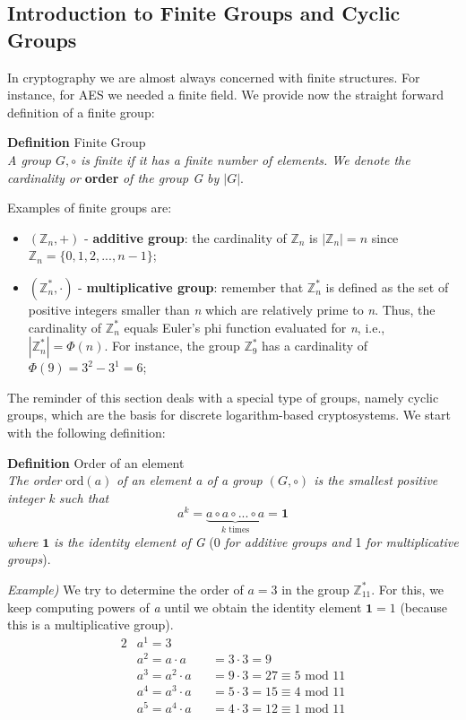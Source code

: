 \documentclass[11pt, a4paper]{article}
\newcommand{\idElement}{
    \textbf{1}
}
\newcommand{\mymod}{
    \text{ mod }
}
\begin{document}
\subsection{Introduction to Finite Groups and Cyclic Groups}
In cryptography we are almost always concerned with finite structures. For instance, for AES we needed a finite field. We provide now the straight forward definition of a finite group:
\begin{framed}
    \hfill\break \textbf{Definition} Finite Group\\
    \textit{A group $G,\circ$ is finite if it has a finite number of elements. We denote the cardinality or} \textbf{order} \textit{of the group G by $|G|$}.
\end{framed}
\hfill\break
Examples of finite groups are:
\begin{itemize}
    \item $(\mathbb{Z}_n,+)$ - \textbf{additive group}: the cardinality of $\mathbb{Z}_n$ is $|\mathbb{Z}_n|=n$ since $\mathbb{Z}_n=\{0,1,2,...,n-1\}$;
    \item $(\mathbb{Z}_n^*,\cdot)$ - \textbf{multiplicative group}: remember that $\mathbb{Z}_n^*$ is defined as the set of positive integers smaller than \textit{n} which are relatively prime to \textit{n}. Thus, the cardinality of $\mathbb{Z}_n^*$ equals Euler's phi function evaluated for \textit{n}, i.e., $|\mathbb{Z}_n^*|=\Phi(n)$. For instance, the group $\mathbb{Z}_9^*$ has a cardinality of $\Phi(9)=3^2-3^1=6$;
\end{itemize}
The reminder of this section deals with a special type of groups, namely cyclic groups, which are the basis for discrete logarithm-based cryptosystems. We start with the following definition:
\begin{framed}
    \hfill\break\textbf{Definition} Order of an element\\
    \textit{The order} $\text{ord}(a)$ \textit{of an element a of a group $(G,\circ)$ is the smallest positive integer k such that}
    $$a^k=\underbrace{a\circ a\circ...\circ a}_{k\text{ times}}=\idElement$$
    \textit{where} $\idElement$ \textit{is the identity element of G} (0 \textit{for additive groups and} 1 \textit{for multiplicative groups}).
\end{framed}
\hfill\break\textit{Example)} We try to determine the order of $a=3$ in the group $\mathbb{Z}_{11}^*$. For this, we keep computing powers of \textit{a} until we obtain the identity element $\idElement=1$ (because this is a multiplicative group).
\begin{alignat*}{2}
    &a^1=3\\
    &a^2=a\cdot a &&= 3\cdot3=9\\
    &a^3=a^2\cdot a &&= 9\cdot3=27 \equiv 5\mymod 11\\
    &a^4=a^3\cdot a &&= 5\cdot3=15 \equiv 4\mymod 11\\
    &a^5=a^4\cdot a &&= 4\cdot3=12 \equiv 1\mymod 11
\end{alignat*}
\end{document}
